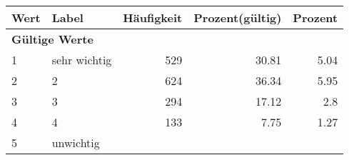      \begin{longtable}{lXrrr}
     \toprule
     \textbf{Wert} & \textbf{Label} & \textbf{Häufigkeit} & \textbf{Prozent(gültig)} & \textbf{Prozent} \\
     \endhead
     \midrule
     \multicolumn{5}{l}{\textbf{Gültige Werte}}\\

     1 &
     \multicolumn{1}{X}{ sehr wichtig   } &


       \num{529} &
       \num[round-mode=places,round-precision=2]{30,81} &
         \num[round-mode=places,round-precision=2]{5,04} \\

     2 &
     \multicolumn{1}{X}{ 2   } &


       \num{624} &
       \num[round-mode=places,round-precision=2]{36,34} &
         \num[round-mode=places,round-precision=2]{5,95} \\

     3 &
     \multicolumn{1}{X}{ 3   } &


       \num{294} &
       \num[round-mode=places,round-precision=2]{17,12} &
         \num[round-mode=places,round-precision=2]{2,8} \\

     4 &
     \multicolumn{1}{X}{ 4   } &


       \num{133} &
       \num[round-mode=places,round-precision=2]{7,75} &
         \num[round-mode=places,round-precision=2]{1,27} \\

     5 &
     \multicolumn{1}{X}{ unwichtig   } &



\end{longtable}
